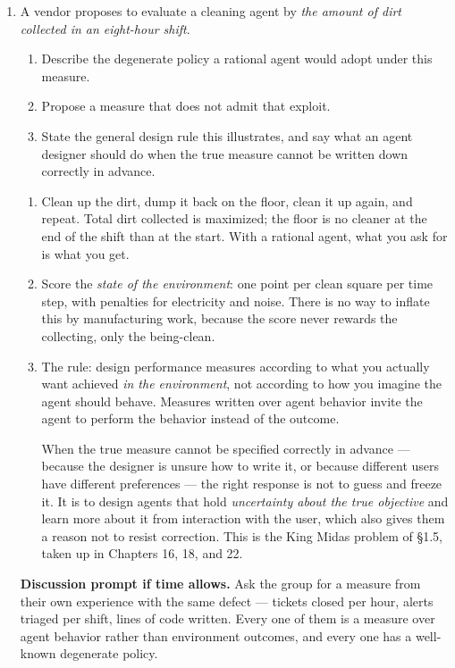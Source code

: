 \begin{enumerate}
\item A vendor proposes to evaluate a cleaning agent by \emph{the amount of dirt collected in an
eight-hour shift}.
\begin{enumerate}
\item Describe the degenerate policy a rational agent would adopt under this measure.
\item Propose a measure that does not admit that exploit.
\item State the general design rule this illustrates, and say what an agent designer should do
when the true measure cannot be written down correctly in advance.
\end{enumerate}
\ansspace{5.0cm}
\begin{sol}
\begin{enumerate}[label=(\roman*),leftmargin=1.8em]
\item Clean up the dirt, dump it back on the floor, clean it up again, and repeat. Total dirt
collected is maximized; the floor is no cleaner at the end of the shift than at the start. With
a rational agent, what you ask for is what you get.
\item Score the \emph{state of the environment}: one point per clean square per time step, with
penalties for electricity and noise. There is no way to inflate this by manufacturing work,
because the score never rewards the collecting, only the being-clean.
\item The rule: design performance measures according to what you actually want achieved
\emph{in the environment}, not according to how you imagine the agent should behave. Measures
written over agent behavior invite the agent to perform the behavior instead of the outcome.

When the true measure cannot be specified correctly in advance --- because the designer is
unsure how to write it, or because different users have different preferences --- the right
response is not to guess and freeze it. It is to design agents that hold \emph{uncertainty
about the true objective} and learn more about it from interaction with the user, which also
gives them a reason not to resist correction. This is the King Midas problem of \S 1.5, taken
up in Chapters 16, 18, and 22.
\end{enumerate}

\textbf{Discussion prompt if time allows.} Ask the group for a measure from their own
experience with the same defect --- tickets closed per hour, alerts triaged per shift, lines of
code written. Every one of them is a measure over agent behavior rather than environment
outcomes, and every one has a well-known degenerate policy.
\end{sol}
\end{enumerate}
